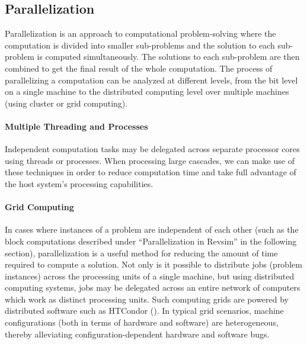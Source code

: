 \subsection{Parallelization}
Parallelization is an approach to computational problem-solving where the computation is divided into smaller sub-problems and the solution to each sub-problem is computed simultaneously. The solutions to each sub-problem are then combined to get the final result of the whole computation. The process of parallelizing a computation can be analyzed at different levels, from the bit level on a single machine to the distributed computing level over multiple machines (using cluster or grid computing).

\paragraph{Multiple Threading and Processes} Independent computation tasks may be delegated across separate processor cores using threads or processes. When processing large cascades, we can make use of these techniques in order to reduce computation time and take full advantage of the host system's processing capabilities.

\paragraph{Grid Computing}
In cases where instances of a problem are independent of each other (such as the block computations described under ``Parallelization in Revsim'' in the following section), parallelization is a useful method for reducing the amount of time required to compute a solution. Not only is it possible to distribute jobs (problem instances) across the processing units of a single machine, but using distributed computing systems, jobs may be delegated across an entire network of computers which work as distinct processing units. Such computing grids are powered by distributed software such as HTCondor (\cite{condor}). In typical grid scenarios, machine configurations (both in terms of hardware and software) are heterogeneous, thereby alleviating configuration-dependent hardware and software bugs. 